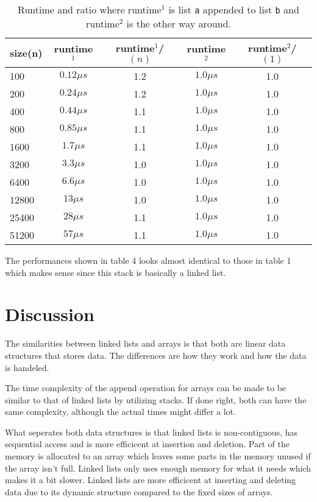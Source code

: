 \documentclass[a4paper,11pt]{article}
\begin{document}
\begin{table}[h]
  \begin{center}
  \begin{tabular}{l|c|c|c|c}
  \textbf{size(n)} & \textbf{runtime$^1$} & \textbf{runtime$^1$/$(n)$} 
  & \textbf{runtime$^2$} & \textbf{runtime$^2$/$(1)$}\\
  \hline
    100     & $ 0.12 \mu s$ &   1.2   & $ 1.0 \mu s$ &    1.0\\
    200     & $ 0.24 \mu s$ &   1.2   & $ 1.0 \mu s$ &    1.0\\
    400     & $ 0.44 \mu s$ &   1.1   & $ 1.0 \mu s$ &    1.0\\
    800     & $ 0.85 \mu s$ &   1.1   & $ 1.0 \mu s$ &    1.0\\
    1600    & $ 1.7 \mu s$  &   1.1   & $ 1.0 \mu s$ &    1.0\\
    3200    & $ 3.3 \mu s$  &   1.0   & $ 1.0 \mu s$ &    1.0\\
    6400    & $ 6.6 \mu s$  &   1.0   & $ 1.0 \mu s$ &    1.0\\
    12800   & $ 13 \mu s$   &   1.0   & $ 1.0 \mu s$ &    1.0\\
    25400   & $ 28 \mu s$   &   1.1   & $ 1.0 \mu s$ &    1.0\\
    51200   & $ 57 \mu s$   &   1.1   & $ 1.0 \mu s$ &    1.0\\ 
  \end{tabular}
  \caption{Runtime and ratio where runtime$^1$ is list {\tt a} appended
          to list {\tt b} and runtime$^2$ is the other way around.}
  \label{tab:table4}
  \end{center}
\end{table}

The performances shown in table 4 looks almost identical to those in 
table 1 which makes sense since this stack is basically a linked list.

\section*{Discussion}

The similarities between linked lists and arrays is that both are
linear data structures that stores data. The differences are how they
work and how the data is handeled.

The time complexity of the append operation for arrays can be made to
be similar to that of linked lists by utilizing stacks. If done right,
both can have the same complexity, although the actual times might 
differ a lot. 

What seperates both data structures is that linked lists is 
non-contiguous, has sequential access and is more efficicent at
insertion and deletion. Part of the memory is allocated to an array
which leaves some parts in the memory unused if the array isn't full.
Linked lists only uses enough memory for what it needs which makes
it a bit slower. Linked lists are more efficicent at inserting and
deleting data due to its dynamic structure compared to the fixed sizes
of arrays.
\end{document}
